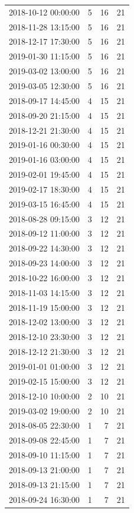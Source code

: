 \begin{tabular}{lrrr}
2018-10-12 00:00:00 & 5 & 16 & 21 \\
2018-11-28 13:15:00 & 5 & 16 & 21 \\
2018-12-17 17:30:00 & 5 & 16 & 21 \\
2019-01-30 11:15:00 & 5 & 16 & 21 \\
2019-03-02 13:00:00 & 5 & 16 & 21 \\
2019-03-05 12:30:00 & 5 & 16 & 21 \\
2018-09-17 14:45:00 & 4 & 15 & 21 \\
2018-09-20 21:15:00 & 4 & 15 & 21 \\
2018-12-21 21:30:00 & 4 & 15 & 21 \\
2019-01-16 00:30:00 & 4 & 15 & 21 \\
2019-01-16 03:00:00 & 4 & 15 & 21 \\
2019-02-01 19:45:00 & 4 & 15 & 21 \\
2019-02-17 18:30:00 & 4 & 15 & 21 \\
2019-03-15 16:45:00 & 4 & 15 & 21 \\
2018-08-28 09:15:00 & 3 & 12 & 21 \\
2018-09-12 11:00:00 & 3 & 12 & 21 \\
2018-09-22 14:30:00 & 3 & 12 & 21 \\
2018-09-23 14:00:00 & 3 & 12 & 21 \\
2018-10-22 16:00:00 & 3 & 12 & 21 \\
2018-11-03 14:15:00 & 3 & 12 & 21 \\
2018-11-19 15:00:00 & 3 & 12 & 21 \\
2018-12-02 13:00:00 & 3 & 12 & 21 \\
2018-12-10 23:30:00 & 3 & 12 & 21 \\
2018-12-12 21:30:00 & 3 & 12 & 21 \\
2019-01-01 01:00:00 & 3 & 12 & 21 \\
2019-02-15 15:00:00 & 3 & 12 & 21 \\
2018-12-10 10:00:00 & 2 & 10 & 21 \\
2019-03-02 19:00:00 & 2 & 10 & 21 \\
2018-08-05 22:30:00 & 1 & 7 & 21 \\
2018-09-08 22:45:00 & 1 & 7 & 21 \\
2018-09-10 11:15:00 & 1 & 7 & 21 \\
2018-09-13 21:00:00 & 1 & 7 & 21 \\
2018-09-13 21:15:00 & 1 & 7 & 21 \\
2018-09-24 16:30:00 & 1 & 7 & 21 \\

\end{tabular}
